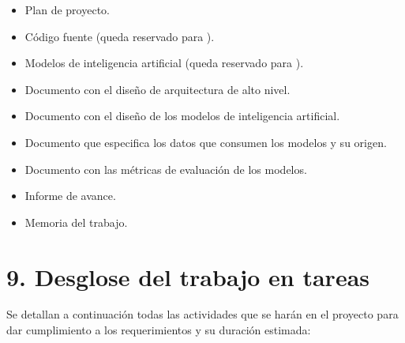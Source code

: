 \documentclass[
11pt, %
]{charter}
\begin{document}
\begin{itemize}
	\item Plan de proyecto.
	\item Código fuente (queda reservado para \empclientename).
	\item Modelos de inteligencia artificial (queda reservado para \empclientename).
	\item Documento con el diseño de arquitectura de alto nivel.
	\item Documento con el diseño de los modelos de inteligencia artificial.
	\item Documento que especifica los datos que consumen los modelos y su origen.
	\item Documento con las métricas de evaluación de los modelos.
	\item Informe de avance.
	\item Memoria del trabajo.
\end{itemize}


\section{9. Desglose del trabajo en tareas}
\label{sec:wbs}

Se detallan a continuación todas las actividades que se harán en el proyecto para dar cumplimiento a los requerimientos y su duración estimada:
\end{document}
